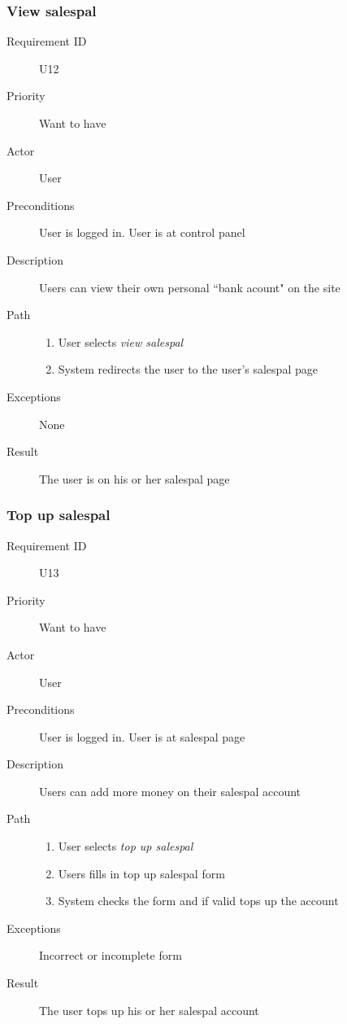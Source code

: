		\subsubsection{View salespal}
			\begin{description}
				\item[Requirement ID] U12
				\item[Priority] Want to have
				\item[Actor] User
				\item[Preconditions] User is logged in. User is at control panel
				\item[Description] Users can view their own personal ``bank acount" on the site
				\item[Path]
 					\begin{enumerate}
						\item User selects \emph{view salespal}
						\item System redirects the user to the user's salespal page
					\end{enumerate}
				\item[Exceptions] None
				\item[Result] The user is on his or her salespal page
			\end{description}
		\subsubsection{Top up salespal}
			\begin{description}
				\item[Requirement ID] U13
				\item[Priority] Want to have
				\item[Actor] User
				\item[Preconditions] User is logged in. User is at salespal page
				\item[Description] Users can add more money on their salespal account
				\item[Path]
 					\begin{enumerate}
						\item User selects \emph{top up salespal}
						\item Users fills in top up salespal form
						\item System checks the form and if valid tops up the account
					\end{enumerate}
				\item[Exceptions] Incorrect or incomplete form
				\item[Result] The user tops up his or her salespal account
			\end{description}

